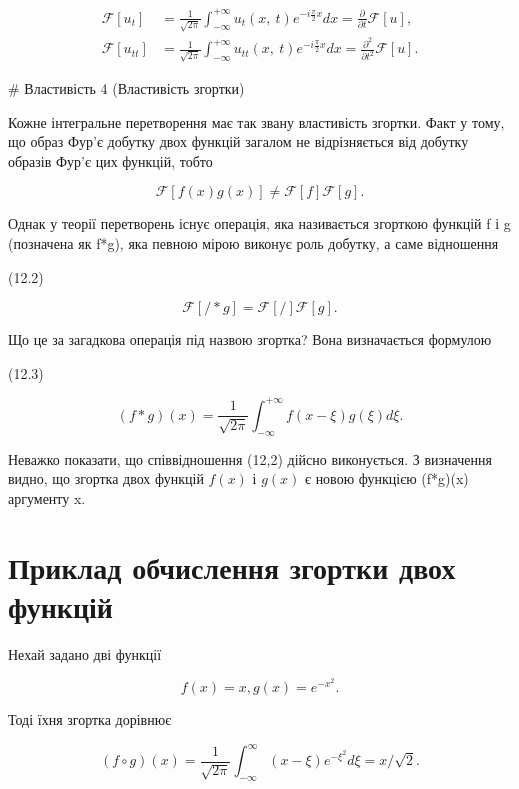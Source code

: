 \documentclass[
  ukrainian,
]{article}
\begin{document}
\[
\begin{aligned} \mathcal{F}\left[u_{t}\right] &= \frac{1}{\sqrt{2\pi}} \int_{-\infty}^{+\infty} u_{t}\left(x, \ t\right) e^{-i\frac{\pi}{2}x} dx = \frac{\partial}{\partial t} \mathcal{F}\left[u\right], \\ \mathcal{F}\left[u_{tt}\right] &= \frac{1}{\sqrt{2\pi}} \int_{-\infty}^{+\infty} u_{tt}\left(x, \ t\right) e^{-i\frac{\pi}{2}x} dx = \frac{\partial^{2}}{\partial t^{2}} \mathcal{F}\left[u\right]. \end{aligned}
\]

\# Властивість 4 (Властивість згортки)

Кожне інтегральне перетворення має так звану властивість згортки. Факт у
тому, що образ Фур'є добутку двох функцій загалом не відрізняється від
добутку образів Фур'є цих функцій, тобто

\[
\mathcal{F}[f(x)g(x)] \neq \mathcal{F}[f]\mathcal{F}[g].
\]

Однак у теорії перетворень існує операція, яка називається згорткою
функцій f і g (позначена як f*g), яка певною мірою виконує роль добутку,
а саме відношення

(12.2)

\[
\mathcal{F}[/*g] = \mathcal{F}[/]\mathcal{F}[g].
\]

Що це за загадкова операція під назвою згортка? Вона визначається
формулою

(12.3)

\[
(f*g)(x) = \frac{1}{\sqrt{2\pi}} \int_{-\infty}^{+\infty} f(x-\xi) g(\xi) d\xi.
\]

Неважко показати, що співвідношення (12,2) дійсно виконується. З
визначення видно, що згортка двох функцій \(f(x)\) і \(g(x)\) є новою
функцією (f*g)(x) аргументу x.

\section{Приклад обчислення згортки двох
функцій}\label{ux43fux440ux438ux43aux43bux430ux434-ux43eux431ux447ux438ux441ux43bux435ux43dux43dux44f-ux437ux433ux43eux440ux442ux43aux438-ux434ux432ux43eux445-ux444ux443ux43dux43aux446ux456ux439}

Нехай задано дві функції

\[
f(x) = x,
g(x) = e^{-x^2}.
\]

Тоді їхня згортка дорівнює

\[
(f \circ g)(x) = \frac{1}{\sqrt{2\pi}} \int_{-\infty}^{\infty} (x - \xi) e^{-\xi^2} d\xi = x/\sqrt{2}.
\]
\end{document}
